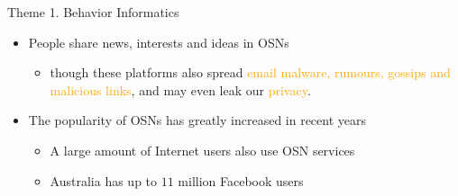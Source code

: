 \documentclass[
 size=14pt,
 paper=smartboard,  %
 mode=present, 		%
 display=slides, 	%
 style=tuliplab,  	%
 pauseslide,
 fleqn,leqno]{powerdot}{}
\begin{document}
\begin{slide}{Theme 1. Behavior Informatics}
\begin{itemize}
\item
People share \textcolor{blue!50}{news, interests}
and \textcolor{blue!50}{ideas} in OSNs

\begin{itemize}
\item
though these platforms also spread
\textcolor{orange}{email malware, rumours, gossips}
\textcolor{orange}{and malicious links}, and may even leak our
\textcolor{orange}{privacy}.
\end{itemize}

\item The popularity of OSNs has greatly increased in recent years

\begin{itemize}
\item
A large amount of Internet users also use OSN services

\item
Australia has up to $11$ million Facebook users
\end{itemize}


\end{itemize}
%
%
\end{slide}
\end{document}
